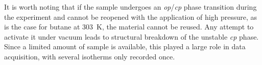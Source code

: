 It is worth noting that if the sample undergoes an \textit{op}/\textit{cp}
phase transition during the experiment and cannot be reopened with
the application of high pressure, as is the case for butane at 
\SI{303}{\kelvin}, the material cannot be reused. Any attempt to
activate it under vacuum leads to structural breakdown of the 
unstable \textit{cp} phase. 
Since a limited amount of sample is available, this played a large
role in data acquisition, with several isotherms only recorded once.
